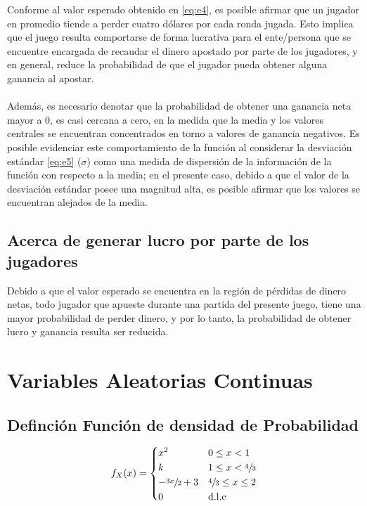 \documentclass[paper=letterpaper]{article}
\begin{document}
Conforme al valor esperado obtenido en \eqref{eq:e4}, es posible afirmar que un jugador en promedio tiende a perder cuatro dólares por cada ronda jugada. Esto implica que el juego resulta comportarse de forma lucrativa para el ente/persona que se encuentre encargada de recaudar el dinero apostado por parte de los jugadores, y en general, reduce la probabilidad de que el jugador pueda obtener alguna ganancia al apostar.
\\
\\
Adem\'{a}s, es necesario denotar que la probabilidad de obtener una ganancia neta mayor a 0, es casi cercana a cero, en la medida que la media y los valores centrales se encuentran concentrados en torno a valores de ganancia negativos. Es posible evidenciar este comportamiento de la función al considerar la desviaci\'{o}n est\'{a}ndar \eqref{eq:e5} ($\sigma$) como una medida de dispersi\'{o}n de la informaci\'{o}n de la funci\'{o}n con respecto a la media; en el presente caso, debido a que el valor de la desviaci\'{o}n est\'{a}ndar posee una magnitud alta, es posible afirmar que los valores se encuentran alejados de la media.


\subsection{Acerca de generar lucro por parte de los jugadores}
Debido a que el valor esperado se encuentra en la región de pérdidas de dinero netas, todo jugador que apueste durante una partida del presente juego, tiene una mayor probabilidad de perder dinero, y por lo tanto, la probabilidad de obtener lucro y ganancia resulta ser reducida.

\section{Variables Aleatorias Continuas}
\subsection{Definci\'{o}n Funci\'{o}n de densidad de Probabilidad}
\begin{equation*}
f_{X}(x) =  
\begin{dcases}
   x^2 & 0 \leq x < 1 \\
   k  & 1 \leq x < \sfrac{4}{3} \\
   -\sfrac{3x}{2} + 3 &  \sfrac{4}{3} \leq x \leq 2 \\
   0 & \text{d.l.c}
\end{dcases}
\end{equation*}
\end{document}

